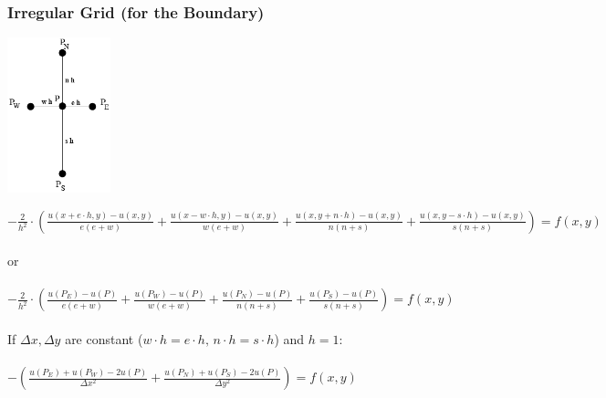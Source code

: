 \subsubsection{Irregular Grid (for the Boundary)}
\begin{minipage}{3cm}
	\includegraphics[width=3cm]{Content/02_numerics/irregulaereGitter.png}
\end{minipage}
\hfill
\begin{minipage}{14cm}

$- \frac{2}{h^2} \cdot \left(\frac{u(x+e \cdot h,y)-u(x,y)}{e(e+w)} +\frac{u(x-w \cdot h,y)-u(x,y)}{w(e+w)}+\frac{u(x,y+n \cdot h)-u(x,y)}{n(n+s)} + \frac{u(x,y-s \cdot h)-u(x,y)}{s(n+s)}\right)=f(x,y)$\\
\\
or\\
\\
$- \frac{2}{h^2} \cdot \left(\frac{u(P_E) - u(P)}{e(e+w)} + \frac{u(P_W) - u(P)}{w(e+w)} + \frac{u(P_N) - u(P)}{n(n+s)} + \frac{u(P_S) - u(P)}{s(n+s)}\right) = f(x,y)$\\
\\
If $\Delta x, \Delta y$ are constant ($w \cdot h = e \cdot h,\, n \cdot h = s \cdot h$) and $h=1$:\\
\\
$-\left(\frac{u(P_E) + u(P_W) - 2 u(P)}{\Delta x^2} + \frac{u(P_N) + u(P_S) - 2 u(P)}{\Delta y^2}\right) = f(x,y)$\\

\end{minipage}
